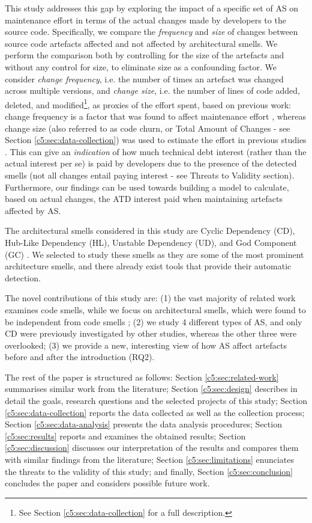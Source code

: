 This study addresses this gap by exploring the impact of a specific set of AS on maintenance effort in terms of the actual changes made by developers to the source code.
Specifically, we compare the  \emph{frequency} and \emph{size} of changes between source code artefacts affected and not affected by architectural smells. We perform the comparison both by controlling for the size of the artefacts and without any control for size, to eliminate size as a confounding factor.
We consider \emph{change frequency}, i.e. the number of times an artefact was changed across multiple versions, and \emph{change size}, i.e. the number of lines of code added, deleted, and modified\footnote{See Section \ref{c5:sec:data-collection} for a full description.}, as proxies of the effort spent, based on previous work: change frequency is a factor that was found to affect maintenance effort \cite{Sjoberg2013,Olbrich2009}, whereas change size (also referred to as code churn, or Total Amount of Changes - see Section \ref{c5:sec:data-collection}) was used to estimate the effort in previous studies \cite{ElEmam2000,Mockus2000}.
This can give an \emph{indication} of how much technical debt interest (rather than the actual interest per se) is paid by developers due to the presence of the detected smells (not all changes entail paying interest - see Threats to Validity section).
Furthermore, our findings can be used towards building a model to calculate, based on actual changes, the ATD interest \cite{Avgeriou2016} paid when maintaining artefacts affected by AS.

The architectural smells considered in this study are Cyclic Dependency (CD), Hub-Like Dependency (HL), Unstable Dependency (UD), and God Component (GC) \cite{Arcelli2016, Lippert2006,Sas2019}.
We selected to study these smells as they are some of the most prominent architecture smells, and there already exist tools that provide their automatic detection.

The novel contributions of this study are: (1) the vast majority of related work examines code smells, while we focus on architectural smells, which were found to be independent from code smells \cite{Arcelli2019}; (2) we study 4 different types of AS, and only CD were previously investigated by other studies, whereas the other three were overlooked; (3) we provide a new, interesting view of how AS affect artefacts before and after the introduction (RQ2).

The rest of the paper is structured as follows:
Section \ref{c5:sec:related-work} summarises similar work from the literature; Section \ref{c5:sec:design} describes in detail the goals, research questions and the selected projects of this study; Section \ref{c5:sec:data-collection} reports the data collected as well as the collection process; Section \ref{c5:sec:data-analysis} presents the data analysis procedures; Section \ref{c5:sec:results} reports and examines the obtained results; Section \ref{c5:sec:discussion} discusses our interpretation of the results and compares them with similar findings from the literature; Section \ref{c5:sec:limitations} enunciates the threats to the validity of this study; and finally, Section \ref{c5:sec:conclusion} concludes the paper and considers possible future work.

